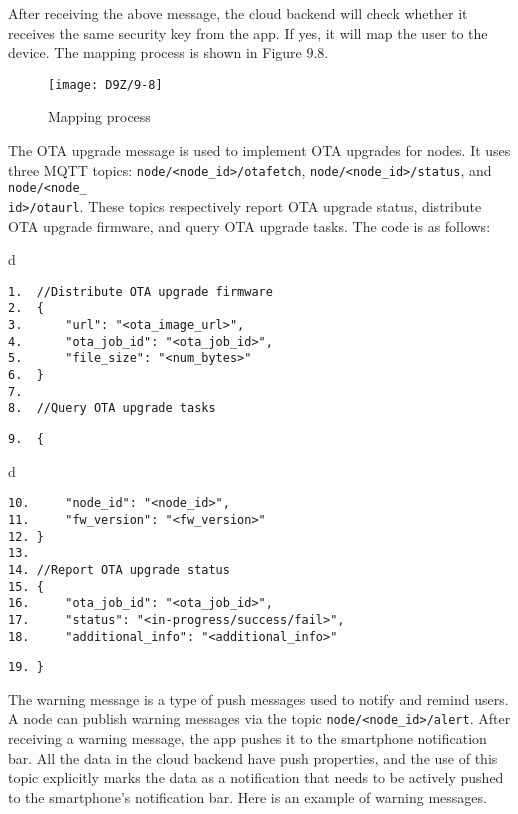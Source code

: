\documentclass[a4paper,12pt]{book}
\begin{document}
After receiving the above message, the cloud backend will check whether it receives the same security key from the app. If yes, it will map the user to the device. The mapping process is shown in Figure 9.8.

\begin{figure}[!h]
    \centering
    \texttt{[image: D9Z/9-8]}
    \caption{Mapping process}
\end{figure}

The OTA upgrade message is used to implement OTA upgrades for nodes. It uses three MQTT topics: \verb|node/<node_id>/otafetch|, \verb|node/<node_id>/status|, and \verb|node/<node_|\\ \verb|id>/otaurl|. These topics respectively report OTA upgrade status, distribute OTA upgrade firmware, and query OTA upgrade tasks. The code is as follows:

\begin{codebloc}
\begin{tabular}{d}
\vspace{2pt}
\begin{verbatim}
1.  //Distribute OTA upgrade firmware
2.  {
3.      "url": "<ota_image_url>",
4.      "ota_job_id": "<ota_job_id>",
5.      "file_size": "<num_bytes>"
6.  }
7.
8.  //Query OTA upgrade tasks
\end{verbatim}
\verb|9.  {|
\end{tabular}
\end{codebloc}

\begin{codebloc}
\begin{tabular}{d}
\vspace{2pt}
\begin{verbatim}
10.     "node_id": "<node_id>",
11.     "fw_version": "<fw_version>"
12. }
13.
14. //Report OTA upgrade status
15. {
16.     "ota_job_id": "<ota_job_id>",
17.     "status": "<in-progress/success/fail>",
18.     "additional_info": "<additional_info>"
\end{verbatim}
\verb|19. }|
\end{tabular}
\end{codebloc}

The warning message is a type of push messages used to notify and remind users. A node can publish warning messages via the topic \verb|node/<node_id>/alert|. After receiving a warning message, the app pushes it to the smartphone notification bar. All the data in the cloud backend have push properties, and the use of this topic explicitly marks the data as a notification that needs to be actively pushed to the smartphone’s notification bar. Here is an example of warning messages.
\end{document}
